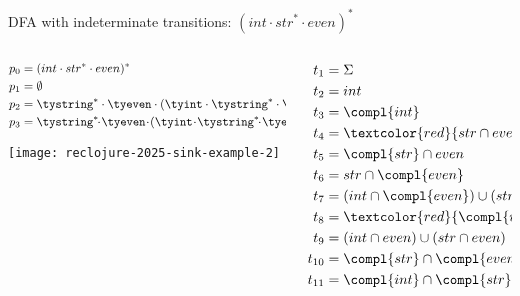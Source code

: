 {\begin{frame}{DFA with indeterminate transitions: $(int \cdot str^{*} \cdot even)^{*}$}
  \begin{columns}
    \begin{column}{0.5\textwidth}
      \begin{align*}
        p_0 &= (int \cdot str^{*} \cdot even)^{*}\\
        p_1 &= \emptyset\\
        p_2 &= \tystring^{*} \cdot \tyeven \cdot (\tyint \cdot \tystring^{*} \cdot \tyeven)^{*}\\
        p_3 &= \tystring^{*}\!\!\cdot\! \tyeven\!\cdot\! (\tyint\! \cdot\! \tystring^{*}\!\!\cdot\! \tyeven)^{*}\! \reor (\tyint\! \cdot\! \tystring^{*}\!\!\cdot\!\! \tyeven)^{*}
      \end{align*}



      \texttt{[image: reclojure-2025-sink-example-2]}
    \end{column}
    \begin{column}{0.5\textwidth}
      \begin{align*}
        t_1 &= \Sigma\\
        t_2 &= int  \\
        t_3 &= \compl{int}\\
        t_4 &= \textcolor{red}{str \cap even}\\
        t_5 &= \compl{str} \cap even\\
        t_6 &= str \cap \compl{even}\\
        t_7 &= (int \cap \compl{even}) \cup (str \cap \compl{even})\\
        t_8 &= \textcolor{red}{\compl{int} \cap \compl{str} \cap even}\\
        t_9 &=(int \cap even) \cup (str \cap even)\\
        t_{10} &=\compl{str} \cap \compl{even}\\
        t_{11} &=\compl{int} \cap \compl{str} \cap \compl{even}
      \end{align*}
    \end{column}
  \end{columns}
\end{frame}


      
}

